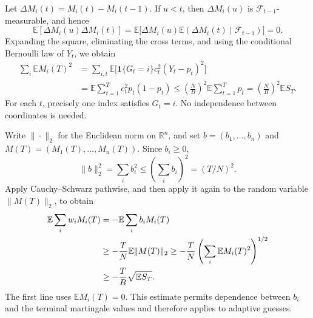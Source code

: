 \documentclass[11pt,reqno]{amsart}
\numberwithin{equation}{section}
\theoremstyle{remark}
\theoremstyle{definition}
\newcommand{\ind}{\mathbf 1}
\begin{document}
Let $\Delta M_i(t)=M_i(t)-M_i(t-1)$. If $u<t$, then $\Delta M_i(u)$ is $\mathcal F_{t-1}$-measurable, and hence
\[
 \mathbb E[\Delta M_i(u)\Delta M_i(t)]
 =\mathbb E\bigl[\Delta M_i(u)\mathbb E(\Delta M_i(t)\mid\mathcal F_{t-1})\bigr]=0.
\]
Expanding the square, eliminating the cross terms, and using the conditional Bernoulli law of $Y_t$, we obtain
\begin{align*}
 \sum_i\mathbb E M_i(T)^2
 &=\sum_{i,t}\mathbb E\bigl[\ind\{G_t=i\}c_t^2(Y_t-p_t)^2\bigr]\\
 &=\mathbb E\sum_{t=1}^Tc_t^2p_t(1-p_t)
 \le\left(\frac NB\right)^2\mathbb E\sum_{t=1}^Tp_t
 =\left(\frac NB\right)^2\mathbb E S_T.
\end{align*}
For each $t$, precisely one index satisfies $G_t=i$. No independence between coordinates is needed.

Write $\|\cdot\|_2$ for the Euclidean norm on $\mathbb R^n$, and set $b=(b_1,\ldots,b_n)$ and $M(T)=(M_1(T),\ldots,M_n(T))$. Since $b_i\ge0$,
\[
 \|b\|_2^2=\sum_i b_i^2\le\left(\sum_i b_i\right)^2=(T/N)^2.
\]
Apply Cauchy--Schwarz pathwise, and then apply it again to the random variable $\|M(T)\|_2$, to obtain
\begin{align}
 \mathbb E\sum_iw_iM_i(T)
 &=-\mathbb E\sum_i b_iM_i(T)\notag\\
 &\ge-\frac TN\mathbb E\|M(T)\|_2
 \ge-\frac TN\left(\sum_i\mathbb E M_i(T)^2\right)^{1/2}\notag\\
 &\ge-\frac TB\sqrt{\mathbb E S_T}.\label{low:eq:weighted}
\end{align}
The first line uses $\mathbb E M_i(T)=0$. This estimate permits dependence between $b_i$ and the terminal martingale values and therefore applies to adaptive guesses.
\end{document}

